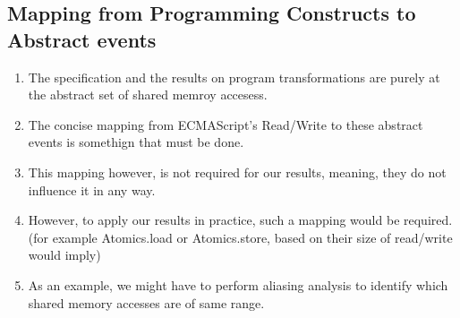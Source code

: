     \subsection{Mapping from Programming Constructs to Abstract events}
    \begin{enumerate}
        \item The specification and the results on program transformations are purely at the abstract set of shared memroy accesess. 
        \item The concise mapping from ECMAScript's Read/Write to these abstract events is somethign that must be done. 
        \item This mapping however, is not required for our results, meaning, they do not influence it in any way.
        \item However, to apply our results in practice, such a mapping would be required. (for example Atomics.load or Atomics.store, based on their size of read/write would imply)
        \item As an example, we might have to perform aliasing analysis to identify which shared memory accesses are of same range. 
    \end{enumerate}

   